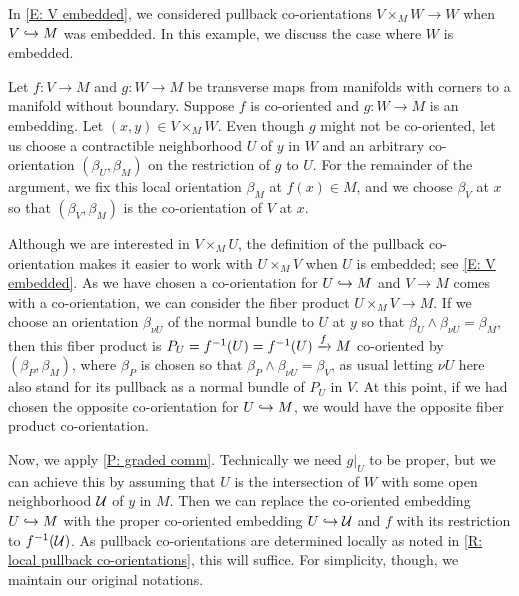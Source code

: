 \begin{example}\label{E: embedded}
	In \cref{E: V embedded}, we considered pullback co-orientations $V \times_M W \to W$ when $V \hookrightarrow M$ was embedded.
	In this example, we discuss the case where $W$ is embedded.

	Let $f \colon V \to M$ and $g \colon W \to M$ be transverse maps from manifolds with corners to a manifold without boundary.
	Suppose $f$ is co-oriented and $g \colon W \to M$ is an embedding.
	Let $(x,y) \in V \times_M W$.
	Even though $g$ might not be co-oriented, let us choose a contractible neighborhood $U$ of $y$ in $W$ and an arbitrary co-orientation $(\beta_U,\beta_M)$ on the restriction of $g$ to $U$.
	For the remainder of the argument, we fix this local orientation $\beta_M$ at $f(x) \in M$, and we choose $\beta_V$ at $x$ so that $(\beta_V,\beta_M)$ is the co-orientation of $V$ at $x$.

	Although we are interested in $V \times_M U$, the definition of the pullback co-orientation makes it easier to work with $U \times_M V$ when $U$ is embedded; see \cref{E: V embedded}.
	As we have chosen a co-orientation for $U \hookrightarrow M$ and $V \to M$ comes with a co-orientation, we can consider
	the fiber product $U \times_M V \to M$.
	If we choose an orientation $\beta_{\nu U}$ of the normal bundle to $U$ at $y$ so that $\beta_U \wedge \beta_{\nu U} = \beta_M$, then this fiber product is $P_U = f^{-1}(U) = f^{-1}(U) \xrightarrow{f} M$ co-oriented by $(\beta_P,\beta_M)$, where $\beta_P$ is chosen so that $\beta_P \wedge \beta_{\nu U} = \beta_V$, as usual letting $\nu U$ here also stand for its pullback as a normal bundle of $P_U$ in $V$.
	At this point, if we had chosen the opposite co-orientation for $U \hookrightarrow M$, we would have the opposite fiber product co-orientation.

	Now, we apply \cref{P: graded comm}.
	Technically we need $g|_U$ to be proper, but we can achieve this by assuming that $U$ is the intersection of $W$ with some open neighborhood $\mathcal{U}$ of $y$ in $M$.
	Then we can replace the co-oriented embedding $U \hookrightarrow M$ with the proper co-oriented embedding $U \hookrightarrow \mathcal{U}$ and $f$ with its restriction to $f^{-1}(\mathcal{U})$.
	As pullback co-orientations are determined locally as noted in \cref{R: local pullback co-orientations}, this will suffice.
	For simplicity, though, we maintain our original notations.


\end{example}
